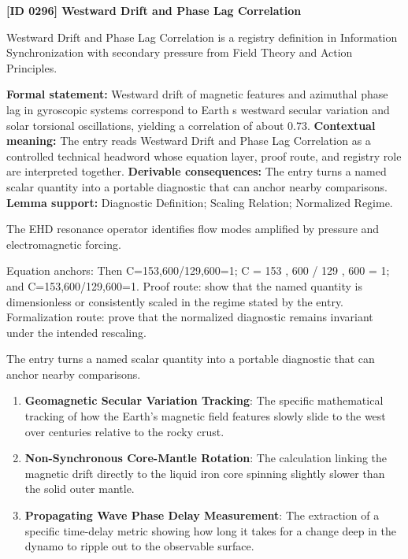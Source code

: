 \clearpage
\noindent\textbf{[ID 0296] Westward Drift and Phase Lag Correlation}\par
\vspace{0.35em}
\begingroup\small
{}
Westward Drift and Phase Lag Correlation is a registry definition in Information Synchronization with secondary pressure from Field Theory and Action Principles.

\begingroup\footnotesize\setlength{\emergencystretch}{3em}\sloppy
\textbf{Formal statement:} Westward drift of magnetic features and azimuthal phase lag in gyroscopic systems correspond to Earth s westward secular variation and solar torsional oscillations, yielding a correlation of about 0.73. \textbf{Contextual meaning:} The entry reads Westward Drift and Phase Lag Correlation as a controlled technical headword whose equation layer, proof route, and registry role are interpreted together. \textbf{Derivable consequences:} The entry turns a named scalar quantity into a portable diagnostic that can anchor nearby comparisons. \textbf{Lemma support:} Diagnostic Definition; Scaling Relation; Normalized Regime.\par
\endgroup

The EHD resonance operator identifies flow modes amplified by pressure and electromagnetic forcing.

Equation anchors: Then C=153,600/129,600=1; C = 153 , 600 / 129 , 600 = 1; and C=153,600/129,600=1. Proof route: show that the named quantity is dimensionless or consistently scaled in the regime stated by the entry. Formalization route: prove that the normalized diagnostic remains invariant under the intended rescaling.

The entry turns a named scalar quantity into a portable diagnostic that can anchor nearby comparisons.
\endgroup

\begin{enumerate}[leftmargin=1.6em,itemsep=6pt,topsep=4pt]
\item \textbf{Geomagnetic Secular Variation Tracking}: The specific mathematical tracking of how the Earth's magnetic field features slowly slide to the west over centuries relative to the rocky crust.
\item \textbf{Non-Synchronous Core-Mantle Rotation}: The calculation linking the magnetic drift directly to the liquid iron core spinning slightly slower than the solid outer mantle.
\item \textbf{Propagating Wave Phase Delay Measurement}: The extraction of a specific time-delay metric showing how long it takes for a change deep in the dynamo to ripple out to the observable surface.
\end{enumerate}

